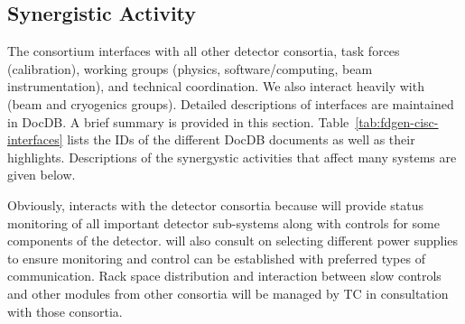 \begin{comment}
\\ \toprowrule
22
&
Problems in interfacing  hardware devices (e.g. power supplies) with slow controls
&
Slow controls team could have problems to monitor/control some hardware devices which do not have the necessary services/options
&
M
The choice of HV/LV power supplies and other hardware devices that need control/monitoring should be done in consultation with slow control experts to ensure the hardware choice allows for robust control/monitoring at the precision needed. 
\end{tabular}
\end{table}
\end{comment}

\subsection{Synergistic Activity}
\label{sec:interfaces}

The  consortium interfaces  with all other detector consortia, task forces (calibration),
working groups (physics, software/computing, beam instrumentation), and technical coordination. We also interact heavily with  (beam and cryogenics groups).  
Detailed descriptions of  interfaces are maintained in  DocDB. A brief summary is provided in this section. Table~\ref{tab:fdgen-cisc-interfaces} lists the IDs of the different DocDB documents as well as their highlights. Descriptions of the synergystic activities that affect many systems are given below. 

Obviously,  interacts with the detector consortia because  will provide status monitoring of all important detector sub-systems along with controls for some components of the detector.
 will also consult on selecting different power supplies to ensure monitoring and control can be established with preferred types of communication. 
Rack space distribution and interaction between slow controls and other modules from other consortia will be managed by TC in consultation with those consortia. 

